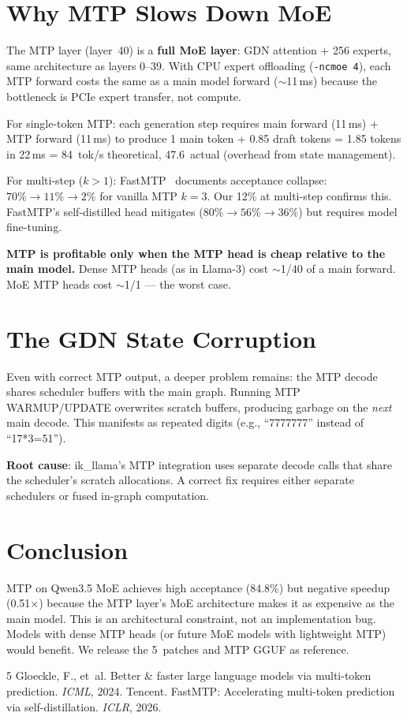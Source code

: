 \documentclass[10pt,a4paper]{article}
\begin{document}
\section{Why MTP Slows Down MoE}

The MTP layer (layer~40) is a \textbf{full MoE layer}: GDN attention + 256 experts, same architecture as layers 0--39. With CPU expert offloading (\texttt{-ncmoe 4}), each MTP forward costs the same as a main model forward ($\sim$11\,ms) because the bottleneck is PCIe expert transfer, not compute.

For single-token MTP: each generation step requires main forward (11\,ms) + MTP forward (11\,ms) to produce 1 main token + 0.85 draft tokens = 1.85 tokens in 22\,ms = 84~tok/s theoretical, 47.6~actual (overhead from state management).

For multi-step ($k{>}1$): FastMTP~\cite{fastmtp2024} documents acceptance collapse: $70\% \to 11\% \to 2\%$ for vanilla MTP $k{=}3$. Our 12\% at multi-step confirms this. FastMTP's self-distilled head mitigates ($80\% \to 56\% \to 36\%$) but requires model fine-tuning.

\textbf{MTP is profitable only when the MTP head is cheap relative to the main model.} Dense MTP heads (as in Llama-3) cost $\sim$1/40 of a main forward. MoE MTP heads cost $\sim$1/1 --- the worst case.

\section{The GDN State Corruption}

Even with correct MTP output, a deeper problem remains: the MTP decode shares scheduler buffers with the main graph. Running MTP WARMUP/UPDATE overwrites scratch buffers, producing garbage on the \emph{next} main decode. This manifests as repeated digits (e.g., ``7777777'' instead of ``17*3=51'').

\textbf{Root cause}: ik\_llama's MTP integration uses separate decode calls that share the scheduler's scratch allocations. A correct fix requires either separate schedulers or fused in-graph computation.

\section{Conclusion}

MTP on Qwen3.5 MoE achieves high acceptance (84.8\%) but negative speedup (0.51$\times$) because the MTP layer's MoE architecture makes it as expensive as the main model. This is an architectural constraint, not an implementation bug. Models with dense MTP heads (or future MoE models with lightweight MTP) would benefit. We release the 5~patches and MTP GGUF as reference.

\begin{thebibliography}{5}
 Gloeckle, F., et~al. Better \& faster large language models via multi-token prediction. \emph{ICML}, 2024.
 Tencent. FastMTP: Accelerating multi-token prediction via self-distillation. \emph{ICLR}, 2026.
\end{thebibliography}
\end{document}
